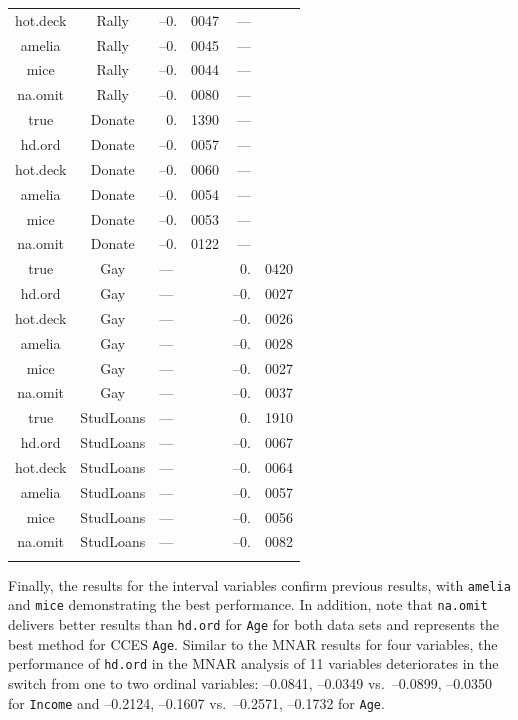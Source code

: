 \documentclass[12pt,econ]{sources/authesis}
\begin{document}
\begin{longtable}{ccr@{}lr@{}l}
 hot.deck & Rally & --0.&0047 & --- \\ 
 amelia & Rally & --0.&0045 & --- \\
 mice & Rally & --0.&0044 & --- \\
 na.omit & Rally & --0.&0080 & --- \\
 true & Donate & 0.&1390 & --- \\
 hd.ord & Donate & --0.&0057 & --- \\ 
 hot.deck & Donate & --0.&0060 & --- \\ 
 amelia & Donate & --0.&0054 & --- \\  
 mice & Donate & --0.&0053 & --- \\ 
 na.omit & Donate & --0.&0122 & --- \\ 
 true & Gay & \multicolumn{2}{l}{---} & 0.&0420 \\ 
 hd.ord & Gay & \multicolumn{2}{l}{---} & --0.&0027 \\
 hot.deck & Gay & \multicolumn{2}{l}{---} & --0.&0026 \\ 
 amelia & Gay & \multicolumn{2}{l}{---} & --0.&0028 \\ 
 mice & Gay & \multicolumn{2}{l}{---} & --0.&0027 \\ 
 na.omit & Gay & \multicolumn{2}{l}{---} & --0.&0037 \\
 true & StudLoans & \multicolumn{2}{l}{---} & 0.&1910 \\
 hd.ord & StudLoans & \multicolumn{2}{l}{---} & --0.&0067 \\
 hot.deck & StudLoans & \multicolumn{2}{l}{---} & --0.&0064 \\
 amelia & StudLoans & \multicolumn{2}{l}{---} & --0.&0057 \\
 mice & StudLoans & \multicolumn{2}{l}{---} & --0.&0056 \\ 
 na.omit & StudLoans & \multicolumn{2}{l}{---} & --0.&0082 \\
 \hline \\[-1.8ex] 
 \end{longtable}
\dsp

\normalsize

Finally, the results for the interval variables confirm previous results, with \texttt{amelia} and \texttt{mice} demonstrating the best performance. In addition, note that \texttt{na.omit} delivers better results than \texttt{hd.ord} for \texttt{Age} for both data sets and represents the best method for CCES \texttt{Age}. Similar to the MNAR results for four variables, the performance of \texttt{hd.ord} in the MNAR analysis of 11 variables deteriorates in the switch from one to two ordinal variables: --0.0841, --0.0349 vs.~--0.0899, --0.0350 for \texttt{Income} and --0.2124, --0.1607 vs.~--0.2571, --0.1732 for \texttt{Age}.
\end{document}

